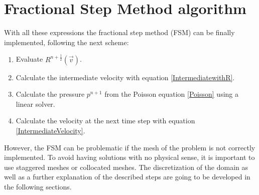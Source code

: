 \section{Fractional Step Method algorithm}
With all these expressions the fractional step method (FSM) can be finally implemented, following the next scheme:
\begin{enumerate}
	\item Evaluate $R^{n+\frac{1}{2}}\left(\vec{v}\right)$.
	\item Calculate the intermediate velocity with equation \ref{IntermediatewithR}.
	\item Calculate the pressure $p^{n+1}$ from the Poisson equation \ref{Poisson} using a linear solver.
	\item Calculate the velocity at the next time step with equation \ref{IntermediateVelocity}.
\end{enumerate}
However, the FSM can be problematic if the mesh of the problem is not correctly implemented. To avoid having solutions with no physical sense, it is important to use staggered meshes or collocated meshes. The discretization of the domain as well as a further explanation of the described steps are going to be developed in the following sections.

